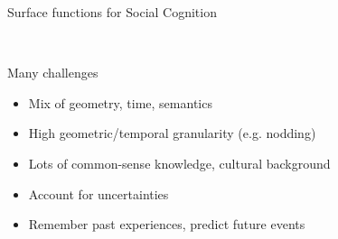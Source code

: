 \documentclass[handout,compress]{beamer}
\begin{document}
{\begin{frame}{Surface functions for Social Cognition}
{\begin{tikzpicture}[
                    >=latex,
                every edge/.style={<-, draw, very thick}]
        \end{tikzpicture}
    }
    \\
\end{frame}
}










{
    \begin{frame}[plain]
        \vspace{11em}
        \begin{exampleblock}{Many challenges}

        \begin{itemize}
            \item Mix of geometry, time, semantics
            \item High geometric/temporal granularity (e.g. nodding)
            \item Lots of common-sense knowledge, cultural background
            \item Account for uncertainties
            \item Remember past experiences, predict future events
        \end{itemize}
        \end{exampleblock}
    \end{frame}
}

\end{document}
